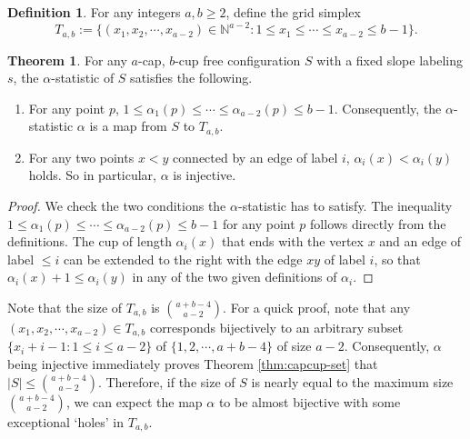 \documentclass{amsart}
\newcommand{\NN}{\mathbb{N}}
\theoremstyle{definition}
\newtheorem{theorem}[thm]{Theorem}
\newtheorem{definition}[thm]{Definition}
\numberwithin{thm}{section}
\begin{document}
\begin{definition}
For any integers $a, b \geq 2$, define the grid simplex
$$T_{a, b} := \{(x_1, x_2, \cdots, x_{a-2}) \in \NN^{a - 2} \colon 1 \leq x_1 \leq \cdots \leq x_{a-2} \leq b - 1\}.$$
\end{definition}

\begin{theorem}
\label{thm:inj}
For any $a$-cap, $b$-cup free configuration $S$ with a fixed slope labeling $s$, the $\alpha$-statistic of $S$ satisfies the following.
\begin{enumerate}
	\item For any point $p$, $1 \leq \alpha_1(p) \leq \cdots \leq \alpha_{a-2} (p) \leq b - 1$. Consequently, the $\alpha$-statistic $\alpha$ is a map from $S$ to $T_{a, b}$.
	\item For any two points $x < y$ connected by an edge of label $i$, $\alpha_i(x) < \alpha_i(y)$ holds. So in particular, $\alpha$ is injective.
\end{enumerate}
\end{theorem}
\begin{proof}
We check the two conditions the $\alpha$-statistic has to satisfy.
The inequality $1 \leq \alpha_1(p) \leq \cdots \leq \alpha_{a-2} (p) \leq b - 1$ for any point $p$ follows directly from the definitions.
The cup of length $\alpha_i(x)$ that ends with the vertex $x$ and an edge of label $\leq i$ can be extended to the right with the edge $xy$ of label $i$, so that $\alpha_i(x) + 1 \leq \alpha_i(y)$ in any of the two given definitions of $\alpha_i$.
\end{proof}
 
Note that the size of $T_{a, b}$ is $\binom{a+b-4}{a-2}$.
For a quick proof, note that any $(x_1, x_2, \cdots, x_{a-2}) \in T_{a, b}$ corresponds bijectively
to an arbitrary subset $\{x_i + i - 1 \colon 1 \leq i \leq a-2\}$ of $\{1, 2, \cdots, a + b - 4 \}$ of size $a-2$.
Consequently, $\alpha$ being injective immediately proves Theorem \ref{thm:capcup-set} that $|S| \leq \binom{a+b-4}{a-2}$.
Therefore, if the size of $S$ is nearly equal to the maximum size $\binom{a+b-4}{a-2}$,
we can expect the map $\alpha$ to be almost bijective with some exceptional `holes' in $T_{a, b}$.
\end{document}
